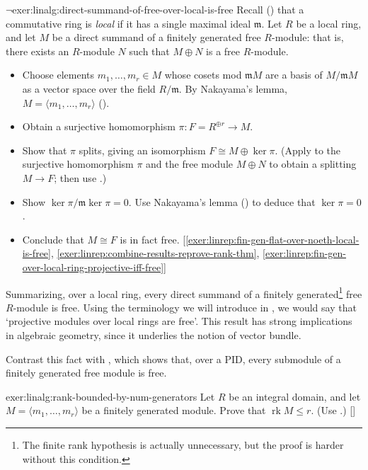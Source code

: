\begin{exer}{$\lnot$}{exer:linalg:direct-summand-of-free-over-local-is-free}
  Recall () that a
  commutative ring is \emph{local} if it has a single maximal ideal
  $\mathfrak{m}$. Let $R$ be a local ring, and let $M$ be a direct
  summand of a finitely generated free $R$-module: that is, there
  exists an $R$-module $N$ such that $M \oplus N$ is a free
  $R$-module.
  \begin{itemize}
  \item Choose elements $m_1, \dots, m_r \in M$ whose cosets mod
    $\mathfrak{m}M$ are a basis of $M/\mathfrak{m}M$ as a vector space
    over the field $R/\mathfrak{m}$. By Nakayama's lemma,
    $M = \langle m_1, \dots, m_r \rangle$
    ().
  \item Obtain a surjective homomorphism
    $\pi : F = R^{\oplus r} \to M$.
  \item Show that $\pi$ splits, giving an isomorphism
    $F \cong M \oplus \ker\pi$. (Apply
     to the surjective homomorphism
    $\pi$ and the free module $M \oplus N$ to obtain a splitting
    $M \to F$; then use .)
  \item Show $\ker\pi/\mathfrak{m}\ker\pi = 0$. Use Nakayama's lemma
    () to deduce that $\ker\pi = 0$.
  \item Conclude that $M \cong F$ is in fact
    free. [\ref{exer:linrep:fin-gen-flat-over-noeth-local-is-free},
    \ref{exer:linrep:combine-results-reprove-rank-thm},
    \ref{exer:linrep:fin-gen-over-local-ring-projective-iff-free}]
  \end{itemize}
  Summarizing, over a local ring, every direct summand of a finitely
  generated\footnote{The finite rank hypothesis is actually
    unnecessary, but the proof is harder without this condition.} free
  $R$-module is free. Using the terminology we will introduce in
  , we would say that `projective modules over local
  rings are free'. This result has strong implications in algebraic
  geometry, since it underlies the notion of vector bundle.

  Contrast this fact with , which shows that, over a
  PID, every submodule of a finitely generated free module is free.
\end{exer}
\begin{exer}{\exerused}{exer:linalg:rank-bounded-by-num-generators}
  Let $R$ be an integral domain, and let
  $M = \langle m_1, \dots, m_r \rangle$ be a finitely generated
  module. Prove that $\operatorname{rk} M \leq r$. (Use
  .)
  []
\end{exer}
